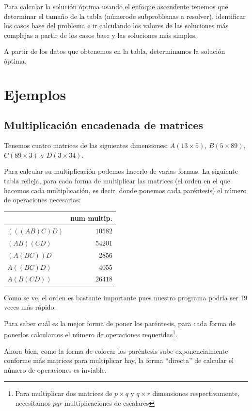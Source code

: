 \documentclass[10pt,a4paper,spanish]{report}
\theoremstyle{definition}
\theoremstyle{remark}
\begin{document}
Para calcular la solución óptima usando el \hyperref[ascendentes]{enfoque ascendente} tenemos que determinar el tamaño de la tabla (númerode subproblemas a resolver), identificar los casos base del problema e ir calculando los valores de las soluciones más complejas a partir de los casos base y las soluciones más simples.

A partir de los datos que obtenemos en la tabla, determinamos la solución óptima.

\section{\textcolor{amethyst}Ejemplos}

\subsection{\textcolor{amethyst}Multiplicación encadenada de matrices}

Tenemos cuatro matrices de las siguientes dimensiones: $A(13 \times 5)$, $B(5 \times 89)$, $C(89 \times 3)$ y $D(3 \times 34)$.

Para calcular su multiplicación podemos hacerlo de varias formas. La siguiente tabla refleja, para cada forma de multiplicar las matrices (el orden en el que hacemos cada multiplicación, es decir, donde ponemos cada paréntesis) el número de operaciones necesarias:

\begin{tabular}{l|r}
& num multip. \\
\hline
$(((AB)C)D)$ & $10582$ \\
$(AB)(CD)$ & $54201$ \\
$(A(BC))D$ & $2856$ \\
$A((BC)D)$ & $4055$ \\
$A(B(CD))$ & $26418$ \\
\end{tabular}

Como se ve, el orden es bastante importante pues nuestro programa podría ser 19 veces más rápido.

Para saber cuál es la mejor forma de poner los paréntesis, para cada forma de ponerlos calculamos el número de operaciones requeridas\footnote{Para multiplicar dos matrices de $p \times q$ y $q \times r$ dimensiones respectivamente, necesitamos $pqr$ multiplicaciones de escalares}.

Ahora bien, como la forma de colocar los paréntesis sube exponencialmente conforme más matrices para multiplicar hay, la forma ``directa'' de calcular el número de operaciones es inviable.
\end{document}
